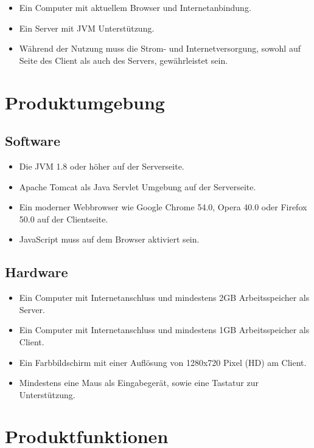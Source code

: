 \documentclass[parskip=full]{scrartcl}
\begin{document}
			\begin{itemize}
				\item Ein Computer mit aktuellem Browser und Internetanbindung.
				\item Ein Server mit \gls{JVM} Unterstützung.
				\item Während der Nutzung muss die Strom- und Internetversorgung, sowohl auf Seite des Client als auch des Servers, gewährleistet sein.
			\end{itemize}
	
	\section{Produktumgebung}
	
		\subsection{Software}
	
			\begin{itemize}
				\item Die JVM 1.8 oder höher auf der Serverseite.
				\item Apache Tomcat als Java \gls{Servlet} Umgebung auf der Serverseite.
				\item Ein moderner Webbrowser wie Google Chrome 54.0, Opera 40.0 oder Firefox 50.0 auf der Clientseite.
				\item \gls{JavaScript} muss auf dem Browser aktiviert sein.
			\end{itemize}
	
		\subsection{Hardware}
	
			\begin{itemize}
				\item Ein Computer mit Internetanschluss und mindestens 2GB Arbeitsspeicher als Server.
				\item Ein Computer mit Internetanschluss und mindestens 1GB Arbeitsspeicher als Client.
				\item Ein Farbbildschirm mit einer Auflösung von 1280x720 Pixel (HD) am Client.
				\item Mindestens eine Maus als Eingabegerät, sowie eine Tastatur zur Unterstützung.
			\end{itemize}
	
	\section{Produktfunktionen}
	
\end{document}
